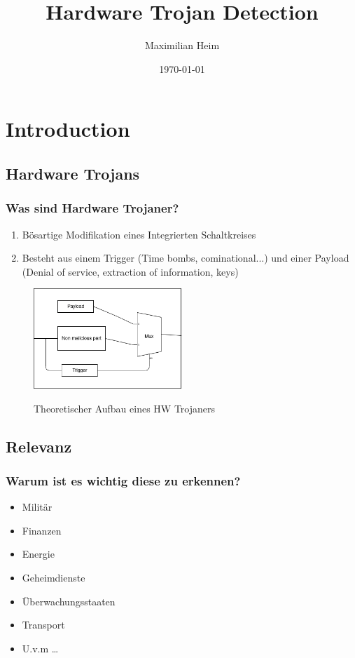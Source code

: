 \documentclass[11pt]{beamer}
\author{Maximilian Heim}
\title{Hardware Trojan Detection}
\institute{University Albstadt-Sigmaringen}
\date{\today}
\begin{document}
\begin{frame}
\titlepage
\end{frame}

\begin{frame}
\tableofcontents
\end{frame}

\section{Introduction}
\subsection{Hardware Trojans}
\begin{frame}
    \frametitle{Was sind Hardware Trojaner?}
    \begin{enumerate}
    \item Bösartige Modifikation eines Integrierten Schaltkreises
    \item Besteht aus einem Trigger (Time bombs, cominational...) und einer Payload (Denial of service, extraction of information, keys)
    \end{enumerate}
    \begin{figure}
        \caption{Theoretischer Aufbau eines HW Trojaners}
        \includegraphics[width=0.5\textwidth]{triggerpayload.png}
        \label{trpl}
    \end{figure}
\end{frame}

\subsection{Relevanz}
\begin{frame}
    \frametitle{Warum ist es wichtig diese zu erkennen?}
    \begin{itemize}
    \item Militär
    \item Finanzen
    \item Energie
    \item Geheimdienste
    \item Überwachungsstaaten
    \item Transport
    \item U.v.m \ldots
    \end{itemize}
\end{frame}
\end{document}
